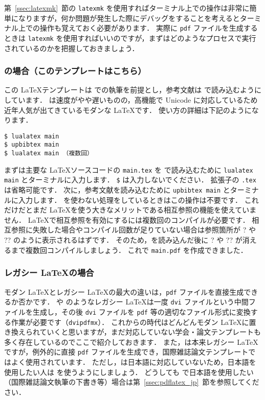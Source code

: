 第~\ref{ssec:latexmk}~節の \verb|latexmk| を使用すればターミナル上での操作は非常に簡単になりますが，何か問題が発生した際にデバッグをすることを考えるとターミナル上での操作も覚えておく必要があります．
実際に \verb|pdf| ファイルを生成するときは \verb|latexmk| を使用すればいいのですが，まずはどのようなプロセスで実行されているのかを把握しておきましょう．

\subsubsection*{\LuaLaTeX の場合（このテンプレートはこちら）}

この \LaTeX テンプレートは \LuaLaTeX での執筆を前提とし，参考文献は \upBibTeX で読み込むようにしています．
\LuaLaTeX は速度がやや遅いものの，高機能で Unicode に対応しているため近年人気が出てきているモダンな \LaTeX です．
使い方の詳細は下記のようになります．

\begin{tcolorbox}[enhanced, title=\LuaLaTeX$+$\upBibTeX, drop fuzzy shadow, colback=red!5!white, colframe=red!75!black]
\begin{verbatim}
$ lualatex main
$ upbibtex main
$ lualatex main （複数回）
\end{verbatim}
\end{tcolorbox}

まずは主要な \LaTeX ソースコードの \verb|main.tex| を \LuaLaTeX で読み込むために \verb|lualatex main| とターミナルに入力します．
\verb|$| は入力しないでください．
拡張子の \verb|.tex| は省略可能です．
次に，参考文献を読み込むために \verb|upbibtex main| とターミナルに入力します．
\BibTeX を使わない処理をしているときはこの操作は不要です．
これだけだとまだ \LaTeX を使う大きなメリットである相互参照の機能を使えていません．
\LaTeX で相互参照を有効にするには複数回のコンパイルが必要です．
相互参照に失敗した場合やコンパイル回数が足りていない場合は参照箇所が ? や ?? のように表示されるはずです．
そのため，\upBibTeX を読み込んだ後に ? や ?? が消えるまで複数回コンパイルしましょう．
これで \verb|main.pdf| を作成できました．

\subsubsection*{レガシー \LaTeX の場合}

モダン \LaTeX とレガシー \LaTeX の最大の違いは，\verb|pdf| ファイルを直接生成できるか否かです．
\pLaTeX や \upLaTeX のようなレガシー \LaTeX は一度 \verb|dvi| ファイルという中間ファイルを生成し，その後 \verb|dvi| ファイルを \verb|pdf| 等の適切なファイル形式に変換する作業が必要です（\verb|dvipdfmx|）．
これからの時代はどんどんモダン \LaTeX に置き換えられていくと思いますが，まだ対応していない学会・論文テンプレートも多く存在しているのでここで紹介しておきます．
また，\pdfLaTeX は本来レガシー \LaTeX ですが，例外的に直接 \verb|pdf| ファイルを生成でき，国際雑誌論文テンプレートではよく使用されています．
ただし，\pdfLaTeX は日本語に対応していないため，日本語を使用したい人は \LuaLaTeX を使うようにしましょう．
どうしても \pdfLaTeX で日本語を使用したい（国際雑誌論文執筆の下書き等）場合は第~\ref{ssec:pdflatex_jp}~節を参照してください．

